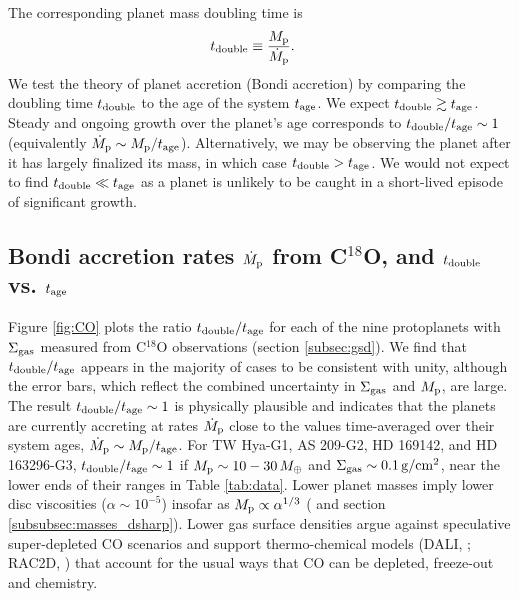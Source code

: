 \documentclass[fleqn,usenatbib]{mnras}
\newcommand{\Mearth}{M_{\oplus}}
\newcommand{\Sigg}{\Sigma_{\rm gas}}
\newcommand{\gcm}{\rm g/cm^2}
\begin{document}
The corresponding planet mass doubling time is
\begin{align}
    t_{\rm double} &\equiv \frac{M_{\rm p}}{\dot{M}_{\rm p}}.
    \label{eqn:tdouble}
\end{align} 
We test the theory of planet
accretion (Bondi accretion) by
comparing the doubling time $t_{\rm double}$ to the age of the system $t_{\rm age}$.
We expect $t_{\rm double} \gtrsim t_{\rm age}$. Steady and ongoing growth over the planet's age corresponds to 
 $t_{\rm double}/t_{\rm age} \sim 1$
 (equivalently $\dot{M}_{\rm p} \sim M_{\rm p}/t_{\rm age}$). Alternatively, we may be observing
 the planet after it has largely finalized its mass, in which case $t_{\rm double} > t_{\rm age}$.
We would not expect to find
$t_{\rm double} \ll t_{\rm age}$
as a planet is unlikely to be
caught in a short-lived episode
of significant growth.

\subsection{Bondi accretion rates $\dot{M}_{\rm p}$ from C$^{18}$O, and $t_{\rm double}$ vs. $t_{\rm age}$}
\label{subsec:main_results}
Figure \ref{fig:CO} plots the ratio $t_{\rm double}/t_{\rm age}$ for each of the nine  protoplanets with $\Sigg$ measured from C$^{18}$O observations (section \ref{subsec:gsd}). 
We find that $t_{\rm double}/t_{\rm age}$ appears in the majority of cases to be consistent with unity, although the error bars, which reflect the combined uncertainty in $\Sigg$ and $M_{\rm p}$, are large. The result $t_{\rm double}/t_{\rm age} \sim 1$ is physically plausible and indicates that the planets are currently accreting at rates $\dot{M}_{\rm p}$ close to the values time-averaged over their system ages, $\dot{M}_{\rm p} \sim M_{\rm p}/t_{\rm age}$. For TW Hya-G1, AS 209-G2, HD 169142, and HD 163296-G3, $t_{\rm double}/t_{\rm age} \sim 1$ if $M_{\rm p} \sim 10-30\,\Mearth$ and $\Sigg \sim 0.1\,\gcm$, near the lower ends of their ranges in Table \ref{tab:data}. Lower planet masses imply lower disc viscosities ($\alpha \sim 10^{-5}$) insofar as $M_{\rm p} \propto \alpha^{1/3}$ (\citealt{zhang_etal_2018} and section \ref{subsubsec:masses_dsharp}). Lower gas surface densities argue against speculative super-depleted CO scenarios
and support thermo-chemical models (DALI, \citealt{bruderer_2013}; RAC2D, \citealt{du_bergin_2014}) that account for the usual ways that CO can be depleted, freeze-out and chemistry.
\end{document}
